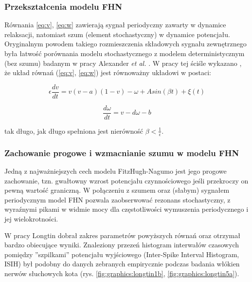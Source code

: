   \subsubsection{Przekształcenia modelu FHN}

  Równania \ref{eq:v}, \ref{eq:w} zawierają sygnał periodyczny zawarty w dynamice relaksacji, natomiast szum (element stochastyczny) w dynamice potencjału. Oryginalnym powodem takiego rozmieszczenia składowych sygnału zewnętrznego była łatwość porównania modelu stochastycznego z modelem deterministycznym (bez szumu) badanym w pracy Alexander \emph{et al.} \cite{alexander}. W pracy tej ściśle wykazano \cite{longtin}, że układ równań (\ref{eq:v}, \ref{eq:w}) jest równoważny układowi w postaci:

  \begin{equation}
    \epsilon \frac{dv}{dt} = v(v-a)(1-v)- \omega + A sin(\beta t) + \xi(t)
  \end{equation}

  \begin{equation}
    \frac{d \omega}{dt} = v - d \omega - b
  \end{equation}

  tak długo, jak długo spełniona jest nierówność $\beta < \frac{1}{\epsilon}$.

  \subsubsection{Zachowanie progowe i wzmacnianie szumu w modelu FHN}

  Jedną z najważniejszych cech modelu FitzHugh-Nagumo jest jego progowe zachowanie, tzn. gwałtowny wzrost potencjału czynnościowego jeśli przekroczy on pewną wartość graniczną. W połączeniu z szumem oraz (słabym) sygnałem periodycznym model FHN pozwala zaobserwować rezonans stochastyczny, z wyraźnymi pikami w widmie mocy dla częstotliwości wymuszenia periodycznego i jej wielokrotności.


  W pracy \cite{longtin} Longtin dobrał zakres parametrów powyższych równań oraz otrzymał bardzo obiecujące wyniki. Znaleziony przezeń histogram interwałów czasowych pomiędzy ''szpilkami'' potencjału wyjściowego (Inter-Spike Interval Histogram, ISIH) był podobny do danych zebranych empirycznie podczas badania włókien nerwów słuchowych kota (rys. \ref{fig:graphics:longtin1b}, \ref{fig:graphics:longtin5a}).

